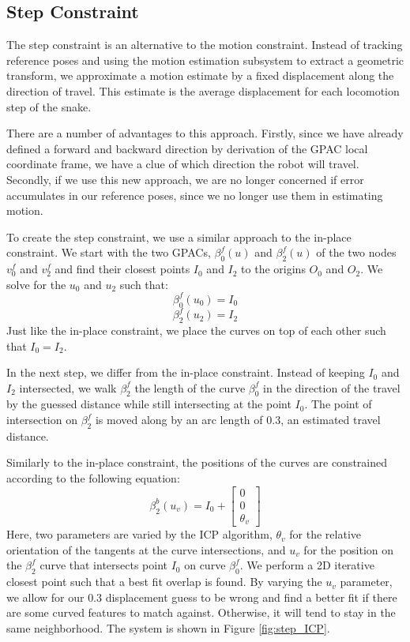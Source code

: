 \subsection{Step Constraint}

The step constraint is an alternative to the motion constraint.  Instead of tracking reference poses and using the motion estimation subsystem to extract a geometric transform, we approximate a motion estimate by a fixed displacement along the direction of travel.  This estimate is the average displacement for each locomotion step of the snake.

There are a number of advantages to this approach.  Firstly, since we have already defined a forward and backward direction by derivation of the GPAC local coordinate frame, we have a clue of which direction the robot will travel.  Secondly, if we use this new approach, we are no longer concerned if error accumulates in our reference poses, since we no longer use them in estimating motion.

To create the step constraint, we use a similar approach to the in-place constraint.  We start with the two GPACs, $\beta_0^f(u)$ and $\beta_2^f(u)$ of the two nodes $v_0^f$ and $v_2^f$ and find their closest points $I_0$ and $I_2$ to the origins $O_0$ and $O_2$.  We solve for the $u_0$ and $u_2$ such that:
\begin{equation}
\beta_0^f(u_0) = I_0
\end{equation}
\begin{equation}
\beta_2^f(u_2) = I_2
\end{equation}
Just like the in-place constraint, we place the curves on top of each other such that $I_0 = I_2$.

In the next step, we differ from the in-place constraint.  Instead of keeping $I_0$ and $I_2$ intersected, we walk $\beta_2^f$ the length of the curve $\beta_0^f$ in the direction of the travel by the guessed distance while still intersecting at the point $I_0$.  The point of intersection on $\beta_2^f$ is moved along by an arc length of $0.3$, an estimated travel distance.

Similarly to the in-place constraint, the positions of the curves are constrained according to the following equation:
\begin{equation}
\beta_2^b(u_v) = I_0 +
\begin{bmatrix}
0 \\
0 \\
\theta_v
\end{bmatrix}
\end{equation}
Here, two parameters are varied by the ICP algorithm, $\theta_v$ for the relative orientation of the tangents at the curve intersections, and $u_v$ for the position on the $\beta_2^f$ curve that intersects point $I_0$ on curve $\beta_0^f$.  We perform a 2D iterative closest point such that a best fit overlap is found.  By varying the $u_v$ parameter, we allow for our $0.3$ displacement guess to be wrong and find a better fit if there are some curved features to match against.  Otherwise, it will tend to stay in the same neighborhood.  The system is shown in Figure \ref{fig:step_ICP}.

